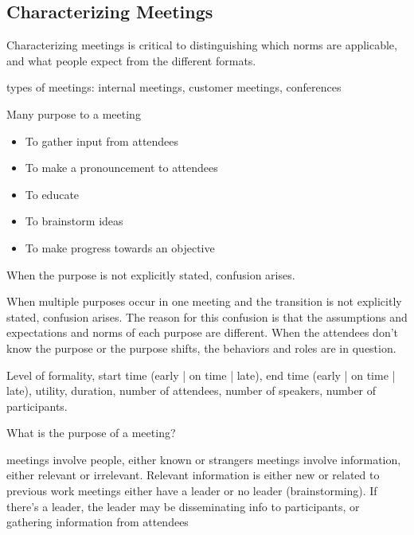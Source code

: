 \subsection{Characterizing Meetings}

Characterizing meetings is critical to distinguishing which norms are applicable, and what people expect from the different formats. 

types of meetings: internal meetings, customer meetings, conferences 

Many purpose to a meeting
\begin{itemize}
    \item To gather input from attendees
    \item To make a pronouncement to attendees
    \item To educate
    \item To brainstorm ideas
    \item To make progress towards an objective
\end{itemize}
When the purpose is not explicitly stated, confusion arises.

When multiple purposes occur in one meeting and the transition is not explicitly stated, confusion arises.
The reason for this confusion is that the assumptions and expectations and norms of each purpose are different. When the attendees don't know the purpose or the purpose shifts, the behaviors and roles are in question.

Level of formality, start time (early | on time | late), 
end time (early | on time | late), utility, 
duration, number of attendees, number of speakers, number of participants.


What is the purpose of a meeting?

meetings involve people, either known or strangers
meetings involve information, either relevant or irrelevant. Relevant information is either new or related to previous work
meetings either have a leader or no leader (brainstorming). If there's a leader, the leader may be disseminating info to participants, or gathering information from attendees